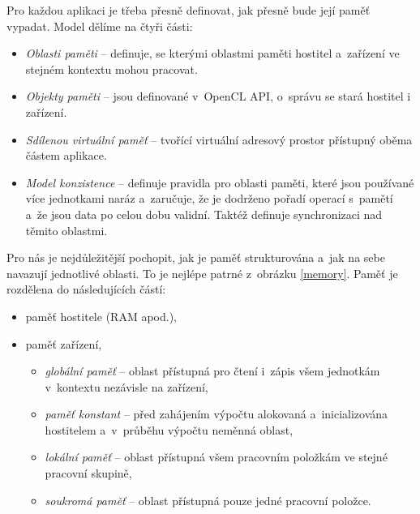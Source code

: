  Pro každou aplikaci je třeba přesně definovat, jak přesně bude její paměť vypadat.
Model dělíme na čtyři části:
\begin{itemize}
    \item {\it Oblasti paměti} -- definuje, se kterými oblastmi paměti hostitel a~zařízení ve
	stejném kontextu mohou pracovat.
    \item {\it Objekty paměti} -- jsou definované v~OpenCL API, o~správu se stará hostitel i
	zařízení.
    \item {\it Sdílenou virtuální paměť} -- tvořící virtuální adresový prostor přístupný oběma
	částem aplikace.
    \item {\it Model konzistence} -- definuje pravidla pro oblasti paměti, které jsou používané
	více jednotkami naráz a~zaručuje, že je dodrženo pořadí operací s~pamětí a~že jsou data po
	celou dobu validní. Taktéž definuje synchronizaci nad těmito oblastmi.
\end{itemize}
\pagebreak
Pro nás je nejdůležitější pochopit, jak je paměť strukturována a~jak na sebe navazují
jednotlivé oblasti. To je nejlépe patrné z~obrázku \ref{memory}. Paměť je rozdělena do následujících
částí:
\begin{itemize}
    \item paměť hostitele (RAM apod.),
    \item paměť zařízení,
    \begin{itemize}
	\item {\it globální paměť} -- oblast přístupná pro čtení i~zápis všem jednotkám
	    v~kontextu nezávisle na zařízení,
	\item {\it paměť konstant} -- před zahájením výpočtu alokovaná a~inicializována
	    hostitelem a~v~průběhu výpočtu neměnná oblast,
	\item {\it lokální paměť} -- oblast přístupná všem pracovním položkám ve stejné pracovní
	    skupině,
	\item {\it soukromá paměť} -- oblast přístupná pouze jedné pracovní položce.
    \end{itemize}
\end{itemize}
